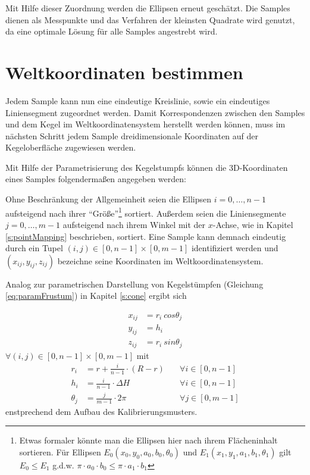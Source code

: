 Mit Hilfe dieser Zuordnung werden die Ellipsen erneut geschätzt. Die Samples dienen als Messpunkte und das Verfahren der kleinsten Quadrate wird genutzt, da eine optimale Lösung für alle Samples angestrebt wird.

\section{Weltkoordinaten bestimmen}
Jedem Sample kann nun eine eindeutige Kreislinie, sowie ein eindeutiges Liniensegment zugeordnet werden. Damit Korrespondenzen zwischen den Samples und dem Kegel im Weltkoordinatensystem herstellt werden können, muss im nächsten Schritt jedem Sample dreidimensionale Koordinaten auf der Kegeloberfläche zugewiesen werden.

Mit Hilfe der Parametrisierung des Kegelstumpfs können die 3D-Koordinaten eines Samples folgendermaßen angegeben werden:

Ohne Beschränkung der Allgemeinheit seien die Ellipsen $i = 0,\dotsc,n - 1$ aufsteigend nach ihrer "`Größe"'\footnote{Etwas formaler könnte man die Ellipsen hier nach ihrem Flächeninhalt sortieren. Für Ellipsen $E_0(x_0,y_0,a_0, b_0, \theta_0)$ und $E_1(x_1,y_1,a_1, b_1,\theta_1)$ gilt $E_0 \leq E_1$ g.d.w. $\pi\cdot a_0 \cdot b_0 \leq \pi \cdot a_1 \cdot b_1$} sortiert.
Außerdem seien die Liniensegmente $j = 0,\dotsc,m - 1$ aufsteigend nach ihrem Winkel mit der $x$-Achse, wie in Kapitel \ref{s:pointMapping} beschrieben, sortiert.
Eine Sample kann demnach eindeutig durch ein Tupel $(i,j) \in [0,n-1]\times [0,m-1]$ identifiziert werden und $(x_{ij},y_{ij},z_{ij})$ bezeichne seine Koordinaten im Weltkoordinatensystem.

Analog zur parametrischen Darstellung von Kegelstümpfen (Gleichung \ref{eq:paramFrustum}) in Kapitel \ref{s:cone} ergibt sich

\[
\begin{aligned}
x_{ij} &= r_i~cos \theta_j \\
y_{ij} &= h_i\\
z_{ij} &= r_i~sin \theta_j
\end{aligned}
\]
$\forall (i,j) \in [0,n-1]\times [0,m-1]$ mit
\[
\begin{aligned}
r_i &= r + \frac{i}{n - 1}\cdot(R - r) \quad&\forall i\in[0,n-1]\\
h_i &= \frac{i}{n - 1}\cdot\Delta H &\forall i\in[0,n-1]\\
\theta_j &= \frac{j}{m-1} \cdot  2\pi  &\forall j\in[0,m-1]
\end{aligned}
\] %
enstprechend dem Aufbau des Kalibrierungsmusters.



